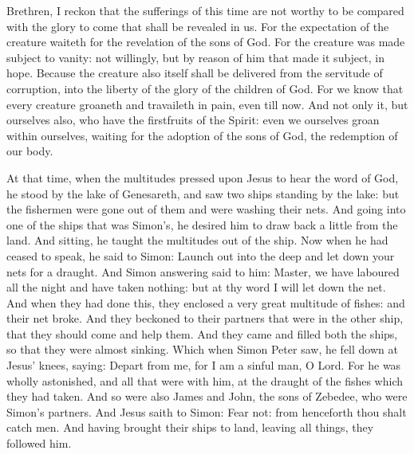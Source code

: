 Brethren, I reckon that the sufferings of this time are not worthy to be
compared with the glory to come that shall be revealed in us.
For the expectation of the creature waiteth for the revelation of
the sons of God.
For the creature was made subject to vanity: not willingly, but by
reason of him that made it subject, in hope.
Because the creature also itself shall be delivered from the
servitude of corruption, into the liberty of the glory of the children
of God.
For we know that every creature groaneth and travaileth in pain,
even till now.
And not only it, but ourselves also, who have the firstfruits of
the Spirit: even we ourselves groan within ourselves, waiting for the
adoption of the sons of God, the redemption of our body.



At that time, when the multitudes pressed upon Jesus to
hear the word of God, he stood by the lake of Genesareth,
and saw two ships standing by the lake: but the fishermen were gone
out of them and were washing their nets.
And going into one of the ships that was Simon's, he desired him to
draw back a little from the land. And sitting, he taught the multitudes
out of the ship.
Now when he had ceased to speak, he said to Simon: Launch out into
the deep and let down your nets for a draught.
And Simon answering said to him: Master, we have laboured all the
night and have taken nothing: but at thy word I will let down the net.
And when they had done this, they enclosed a very great multitude
of fishes: and their net broke.
And they beckoned to their partners that were in the other ship,
that they should come and help them. And they came and filled both the
ships, so that they were almost sinking.
Which when Simon Peter saw, he fell down at Jesus' knees, saying:
Depart from me, for I am a sinful man, O Lord.
For he was wholly astonished, and all that were with him, at the
draught of the fishes which they had taken.
And so were also James and John, the sons of Zebedee, who were
Simon's partners. And Jesus saith to Simon: Fear not: from henceforth
thou shalt catch men.
And having brought their ships to land, leaving all things, they
followed him.




